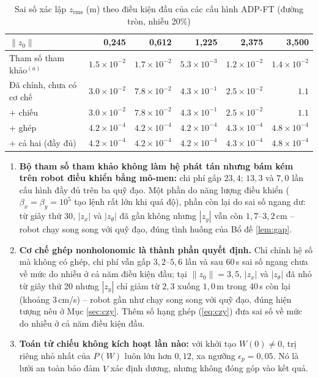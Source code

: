 \documentclass[12pt,a4paper]{article}
\begin{document}
\begin{table}[H]
\centering
\caption{Sai số xác lập $z_\text{rms}$ (m) theo điều kiện đầu của các cấu hình ADP-FT (đường tròn, nhiễu 20\%)}
\label{tab:mech_z0}
\footnotesize
\begin{tabular}{lrrrrr}
\toprule
$\|z_0\|$ & \textbf{0,245} & \textbf{0,612} & \textbf{1,225} & \textbf{2,375} & \textbf{3,500} \\
\midrule
Tham số tham khảo$^{(a)}$ & $1.5\times10^{-2}$ & $1.7\times10^{-2}$ & $5.3\times10^{-3}$ & $1.2\times10^{-2}$ & $1.4\times10^{-2}$ \\
Đã chỉnh, chưa có cơ chế & $3.0\times10^{-2}$ & $7.8\times10^{-2}$ & $4.3\times10^{-1}$ & $2.5\times10^{-2}$ & $1.1$ \\
\quad + chiếu & $3.0\times10^{-2}$ & $7.8\times10^{-2}$ & $4.3\times10^{-1}$ & $2.5\times10^{-2}$ & $1.1$ \\
\quad + ghép & $4.2\times10^{-4}$ & $4.2\times10^{-4}$ & $4.2\times10^{-4}$ & $4.3\times10^{-4}$ & $4.8\times10^{-4}$ \\
\quad + cả hai (đầy đủ) & $4.2\times10^{-4}$ & $4.2\times10^{-4}$ & $4.2\times10^{-4}$ & $4.3\times10^{-4}$ & $4.8\times10^{-4}$ \\
\bottomrule
\end{tabular}
\end{table}

\begin{enumerate}
    \item \textbf{Bộ tham số tham khảo không làm hệ phát tán nhưng bám kém trên robot điều khiển bằng mô-men:} chi phí gấp $23{,}4$; $13{,}3$ và $7{,}0$ lần cấu hình đầy đủ trên ba quỹ đạo. Một phần do năng lượng điều khiển ($\beta_x = \beta_y = 10^5$ tạo lệnh rất lớn khi quá độ), phần còn lại do sai số ngang dư: từ giây thứ 30, $|z_x|$ và $|z_\theta|$ đã gần không nhưng $|z_y|$ vẫn còn $1{,}7$--$3{,}2$\,cm -- robot chạy song song với quỹ đạo, đúng tình huống của Bổ đề \ref{lem:gap}.
    \item \textbf{Cơ chế ghép nonholonomic là thành phần quyết định.} Chỉ chỉnh hệ số mà không có ghép, chi phí vẫn gấp $3{,}2$--$5{,}6$ lần và sau 60\,s sai số ngang chưa về mức do nhiễu ở cả năm điều kiện đầu; tại $\|z_0\| = 3{,}5$, $|z_x|$ và $|z_\theta|$ đã nhỏ từ giây thứ 20 nhưng $|z_y|$ chỉ giảm từ $2{,}3$ xuống $1{,}0$\,m trong 40\,s còn lại (khoảng $3$\,cm/s) -- robot gần như chạy song song với quỹ đạo, đúng hiện tượng nêu ở Mục \ref{sec:czy}. Thêm số hạng ghép (\ref{eq:czy}) đưa sai số về mức do nhiễu ở cả năm điều kiện đầu.
    \item \textbf{Toán tử chiếu không kích hoạt lần nào:} với khởi tạo $W(0) \neq 0$, trị riêng nhỏ nhất của $P(W)$ luôn lớn hơn $0{,}12$, xa ngưỡng $\epsilon_p = 0{,}05$. Nó là lưới an toàn bảo đảm $\hat V$ xác định dương, nhưng không đóng góp vào kết quả.
\end{enumerate}
\end{document}

